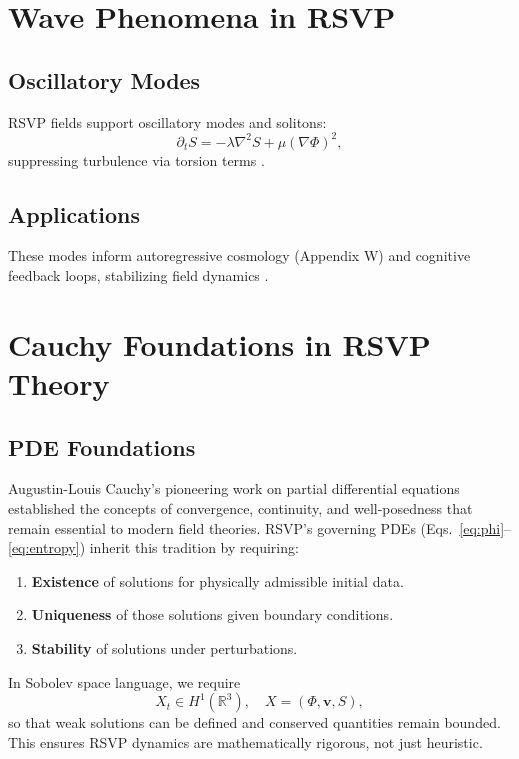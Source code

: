 \documentclass[12pt]{report}
\newcommand{\PhiRSVP}{\Phi}
\newcommand{\SRSVP}{S}
\begin{document}
\chapter{Wave Phenomena in RSVP}
\label{app:W}
\section{Oscillatory Modes}
RSVP fields support oscillatory modes and solitons:
\begin{equation}
\partial_t \SRSVP = -\lambda \nabla^2 \SRSVP + \mu (\nabla \PhiRSVP)^2, \label{eq:appW_wave}
\end{equation}
suppressing turbulence via torsion terms \citep{RSVPMeta2025}.

\section{Applications}
These modes inform autoregressive cosmology (Appendix W) and cognitive feedback loops, stabilizing field dynamics \citep{Flyxion2025}.
\chapter{Cauchy Foundations in RSVP Theory}
\label{app:X}

\section{PDE Foundations}

Augustin-Louis Cauchy’s pioneering work on partial differential equations \citep{Cauchy1821} established the concepts of convergence, continuity, and well-posedness that remain essential to modern field theories.  
RSVP’s governing PDEs (Eqs.~\eqref{eq:phi}--\eqref{eq:entropy}) inherit this tradition by requiring:

\begin{enumerate}
    \item \textbf{Existence} of solutions for physically admissible initial data.  
    \item \textbf{Uniqueness} of those solutions given boundary conditions.  
    \item \textbf{Stability} of solutions under perturbations.  
\end{enumerate}

In Sobolev space language, we require
\begin{equation}
X_t \in H^1(\mathbb{R}^3), \quad X = (\Phi,\mathbf{v},S),
\end{equation}
so that weak solutions can be defined and conserved quantities remain bounded. This ensures RSVP dynamics are mathematically rigorous, not just heuristic.
\end{document}
